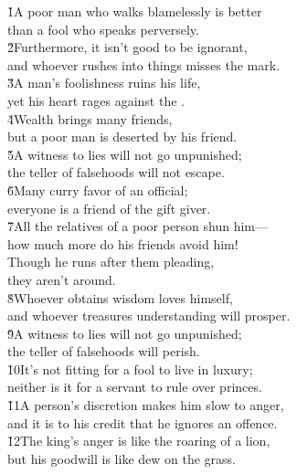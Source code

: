 \begin{poetry}
\poeml {}
\v{1}A poor man who walks blamelessly is better \\
\poeml than a fool who speaks perversely. \\
\poeml \v{2}Furthermore, it isn't good to be ignorant, \\
\poemll    and whoever rushes into things misses the mark. \\
\poeml \v{3}A man's foolishness ruins his life, \\
\poemll    yet his heart rages against the . \\
\poeml \v{4}Wealth brings many friends, \\
\poemll    but a poor man is deserted by his friend. \\
\poeml \v{5}A witness to lies will not go unpunished; \\
\poemll    the teller of falsehoods will not escape. \\
\poeml \v{6}Many curry favor of an official; \\
\poemll    everyone is a friend of the gift giver. \\
\poeml \v{7}All the relatives of a poor person shun him--- \\
\poemll    how much more do his friends avoid him! \\
\poeml Though he runs after them pleading, \\
\poemll    they aren't around. \\
\poeml \v{8}Whoever obtains wisdom loves himself, \\
\poemll    and whoever treasures understanding will prosper. \\
\poeml \v{9}A witness to lies will not go unpunished; \\
\poemll    the teller of falsehoods will perish. \\
\poeml \v{10}It's not fitting for a fool to live in luxury; \\
\poemll    neither is it for a servant to rule over princes. \\
\poeml \v{11}A person's discretion makes him slow to anger, \\
\poemll    and it is to his credit that he ignores an offence. \\
\poeml \v{12}The king's anger is like the roaring of a lion, \\
\poemll    but his goodwill is like dew on the grass. \\

\end{poetry}
